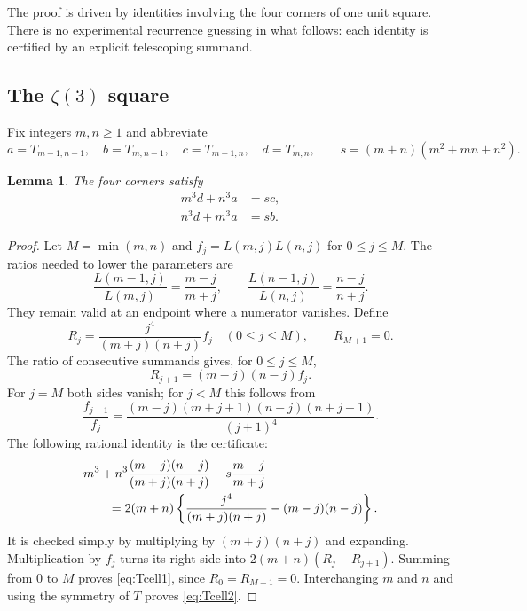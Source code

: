\documentclass[11pt,letterpaper]{article}
\numberwithin{equation}{section}
\newtheorem{lemma}[theorem]{Lemma}
\theoremstyle{definition}
\begin{document}
The proof is driven by identities involving the four corners of one
unit square. There is no experimental recurrence guessing in what follows:
each identity is certified by an explicit telescoping summand.

\subsection{The \texorpdfstring{$\zeta(3)$}{zeta(3)} square}

Fix integers $m,n\geq1$ and abbreviate
\[
 a=T_{m-1,n-1},\quad b=T_{m,n-1},\quad
 c=T_{m-1,n},\quad d=T_{m,n},
 \qquad s=(m+n)(m^2+mn+n^2).
\]

\begin{lemma}\label{lem:Tcell}
The four corners satisfy
\begin{align}
 m^3d+n^3a&=s c,\label{eq:Tcell1}\\
 n^3d+m^3a&=s b.\label{eq:Tcell2}
\end{align}
\end{lemma}
\begin{proof}
Let $M=\min(m,n)$ and $f_j=L(m,j)L(n,j)$ for $0\leq j\leq M$.
The ratios needed to lower the parameters are
\[
 \frac{L(m-1,j)}{L(m,j)}=\frac{m-j}{m+j},\qquad
 \frac{L(n-1,j)}{L(n,j)}=\frac{n-j}{n+j}.
\]
They remain valid at an endpoint where a numerator vanishes.
Define
\[
 R_j=\frac{j^4}{(m+j)(n+j)}f_j\quad(0\leq j\leq M),
 \qquad R_{M+1}=0.
\]
The ratio of consecutive summands gives, for $0\leq j\leq M$,
\begin{equation}\label{eq:Ttelescoper}
 R_{j+1}=(m-j)(n-j)f_j.
\end{equation}
For $j=M$ both sides vanish; for $j<M$ this follows from
\[
 \frac{f_{j+1}}{f_j}
 =\frac{(m-j)(m+j+1)(n-j)(n+j+1)}{(j+1)^4}.
\]
The following rational identity is the certificate:
\begin{align}
 &m^3+n^3\frac{(m-j)(n-j)}{(m+j)(n+j)}
       -s\frac{m-j}{m+j}\notag\\
 &\hspace{2em}=2(m+n)\left\{
 \frac{j^4}{(m+j)(n+j)}-(m-j)(n-j)\right\}.\label{eq:Tcertificate}
\end{align}
It is checked simply by multiplying by $(m+j)(n+j)$ and expanding.
Multiplication by $f_j$ turns its right side into
$2(m+n)(R_j-R_{j+1})$. Summing from $0$ to $M$ proves
\eqref{eq:Tcell1}, since $R_0=R_{M+1}=0$. Interchanging $m$ and $n$
and using the symmetry of $T$ proves \eqref{eq:Tcell2}.
\end{proof}
\end{document}
